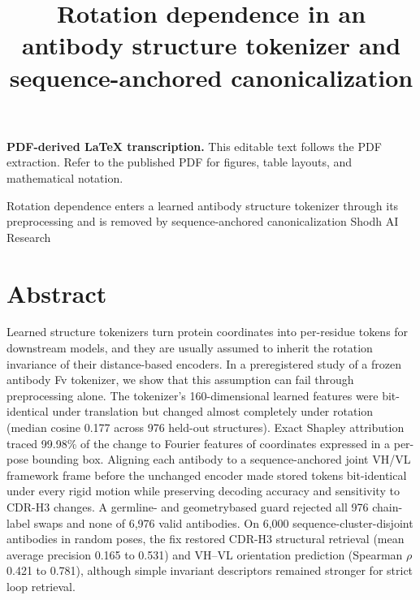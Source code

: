 \documentclass[11pt]{article}
\title{Rotation dependence in an antibody structure tokenizer and sequence-anchored canonicalization}
\author{}
\date{}
\begin{document}
\maketitle
\noindent\textbf{PDF-derived LaTeX transcription.} This editable text follows the PDF extraction. Refer to the published PDF for figures, table layouts, and mathematical notation.


Rotation dependence enters a learned antibody
structure tokenizer through its preprocessing and is
removed by sequence-anchored canonicalization
Shodh AI Research

\section*{Abstract}

Learned structure tokenizers turn protein coordinates into per-residue tokens for downstream models, and they are usually assumed to inherit the rotation invariance of their
distance-based encoders. In a preregistered study of a frozen antibody Fv tokenizer, we show
that this assumption can fail through preprocessing alone. The tokenizer’s 160-dimensional
learned features were bit-identical under translation but changed almost completely under rotation (median cosine 0.177 across 976 held-out structures). Exact Shapley attribution traced
99.98\% of the change to Fourier features of coordinates expressed in a per-pose bounding
box. Aligning each antibody to a sequence-anchored joint VH/VL framework frame before
the unchanged encoder made stored tokens bit-identical under every rigid motion while preserving decoding accuracy and sensitivity to CDR-H3 changes. A germline- and geometrybased guard rejected all 976 chain-label swaps and none of 6,976 valid antibodies. On 6,000
sequence-cluster-disjoint antibodies in random poses, the fix restored CDR-H3 structural retrieval (mean average precision 0.165 to 0.531) and VH–VL orientation prediction (Spearman
\ensuremath{\rho} 0.421 to 0.781), although simple invariant descriptors remained stronger for strict loop
retrieval.
\end{document}
